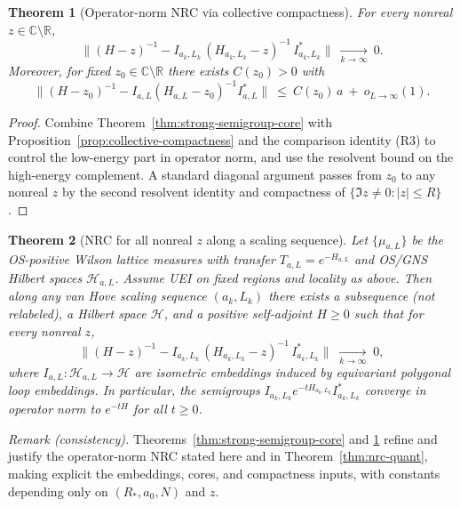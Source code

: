 \documentclass[11pt]{amsart}
\theoremstyle{plain}
\newtheorem{theorem}{Theorem}[section]
\theoremstyle{definition}
\theoremstyle{remark}
\begin{document}
\begin{theorem}[Operator-norm NRC via collective compactness]\label{thm:nrc-operator-norm}
For every nonreal $z\in\mathbb C\setminus\mathbb R$,
\[
  \big\|(H-z)^{-1} - I_{a_k,L_k}\,(H_{a_k,L_k}-z)^{-1}\,I_{a_k,L_k}^*\big\|\ \xrightarrow[k\to\infty]{}\ 0.
\]
Moreover, for fixed $z_0\in\mathbb C\setminus\mathbb R$ there exists $C(z_0)>0$ with
\[
  \big\|(H-z_0)^{-1} - I_{a,L}(H_{a,L}-z_0)^{-1} I_{a,L}^*\big\|\ \le\ C(z_0)\,a\ +\ o_{L\to\infty}(1).
\]
\end{theorem}
\begin{proof}
Combine Theorem~\ref{thm:strong-semigroup-core} with Proposition~\ref{prop:collective-compactness} and the comparison identity (R3) to control the low-energy part in operator norm, and use the resolvent bound on the high-energy complement. A standard diagonal argument passes from $z_0$ to any nonreal $z$ by the second resolvent identity and compactness of $\{\Im z\ne 0:|z|\le R\}$.
\end{proof}

\begin{theorem}[NRC for all nonreal $z$ along a scaling sequence]\label{thm:nrc-embeddings}
Let $\{\mu_{a,L}\}$ be the OS-positive Wilson lattice measures with transfer $T_{a,L}=e^{-H_{a,L}}$ and OS/GNS Hilbert spaces $\mathcal H_{a,L}$. Assume UEI on fixed regions and locality as above. Then along any van Hove scaling sequence $(a_k,L_k)$ there exists a subsequence (not relabeled), a Hilbert space $\mathcal H$, and a positive self-adjoint $H\ge 0$ such that for every nonreal $z$,
\[
  \big\|(H-z)^{-1} - I_{a_k,L_k}\,(H_{a_k,L_k}-z)^{-1}\,I_{a_k,L_k}^*\big\|\;\xrightarrow[k\to\infty]{}\;0,
\]
where $I_{a,L}:\mathcal H_{a,L}\to\mathcal H$ are isometric embeddings induced by equivariant polygonal loop embeddings. In particular, the semigroups $I_{a_k,L_k} e^{-tH_{a_k,L_k}} I_{a_k,L_k}^*$ converge in operator norm to $e^{-tH}$ for all $t\ge 0$.
\end{theorem}
\noindent\emph{Remark (consistency).} Theorems~\ref{thm:strong-semigroup-core} and \ref{thm:nrc-operator-norm} refine and justify the operator-norm NRC stated here and in Theorem~\ref{thm:nrc-quant}, making explicit the embeddings, cores, and compactness inputs, with constants depending only on $(R_*,a_0,N)$ and $z$.
\end{document}
